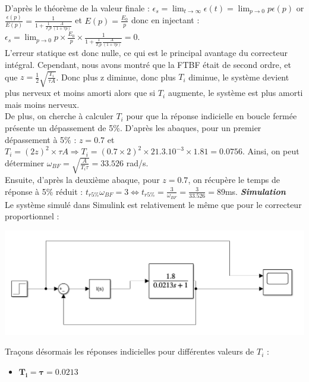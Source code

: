 \documentclass[12pt]{article}
\begin{document}
D'après le théorème de la valeur finale : 
$\epsilon_s = \lim_{t \to \infty}\epsilon(t) = \lim_{p \to 0}p\epsilon(p)$ or $\frac{\epsilon(p)}{E(p)} = \frac{1}{1 + \frac{1}{T_ip}\frac{A}{(1+\tau p)}}$ et $E(p) = \frac{E_0}{p}$ donc en injectant :
$\epsilon_s = \lim_{p \to 0}p \times \frac{E_0}{p}\times \frac{1}{1 + \frac{1}{T_ip}\frac{A}{(1+\tau p)}} = 0$.
\\L'erreur statique est donc nulle, ce qui est le principal avantage du correcteur intégral. Cependant, nous avons montré que la FTBF était de second ordre, et que $z = \frac{1}{2}\sqrt{\frac{T_i}{\tau A}}$. Donc plus z diminue, donc plus $T_i$ diminue, le système devient plus nerveux et moins amorti alors que si $T_i$ augmente, le système est plus amorti mais moins nerveux.
\\De plus, on cherche à calculer $T_i$ pour que la réponse indicielle en boucle fermée présente un dépassement de 5$\%$.
D'après les abaques, pour un premier dépassement à 5$\%$ : $z=0.7$ et $T_i = (2z)^2\times\tau A \Rightarrow T_i = (0.7\times2)^2\times21.3.10^{-3}\times1.81 = 0.0756$.
Ainsi, on peut déterminer $\omega_{BF} = \sqrt{\frac{A}{T_i \tau}} = 33.526$ rad/s.
\\Ensuite, d'après la deuxième abaque, pour $z=0.7$, on récupère le temps de réponse à 5$\%$ réduit :
$t_{r5\%}\omega_{BF} = 3 \Leftrightarrow t_{r5\%} = \frac{3}{\omega_{BF}} = \frac{3}{33.526} = 89$ms.
\newpage
\large \textit{ \textbf{Simulation}}
\\\normalsize Le système simulé dans Simulink est relativement le même que pour le correcteur proportionnel : 
\begin{center}
    \includegraphics[width = 15 cm]{TP2 Simulink/Syst_1/Syst1_Simulink_I.png}
\end{center}

Traçons désormais les réponses indicielles pour différentes valeurs de $T_i$ : 
\begin{itemize}
    \item \large $\mathbf{T_i = \tau = 0.0213}$
\end{itemize}
\end{document}
